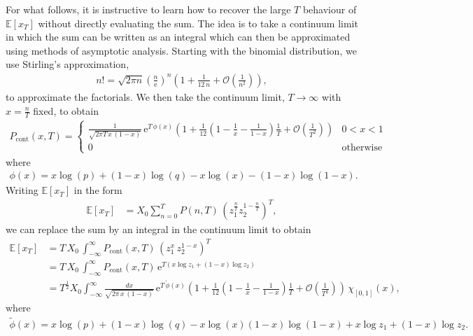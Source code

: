 \documentclass[11pt]{article}
\begin{document}
For what follows, it is instructive to learn how to recover the large $T$ behaviour of $\mathbb{E}\left[x_T \right]$ without directly evaluating the sum.
The idea is to take a continuum limit in which the sum can be written as an integral which can then be approximated using methods of asymptotic analysis.
Starting with the binomial distribution, we use Stirling's approximation,
\begin{align}
n! = \sqrt{2 \pi n} \left( \frac{n}{\mathrm{e}}\right)^n\left(1 + \frac{1}{12\,n} + \mathcal{O}\left(\frac{1}{n^2}\right)\right),
\end{align}
to approximate the factorials. We then take the continuum limit, $T\to \infty$ with $x=\frac{n}{T}$ fixed,
 to obtain 
\begin{align}
\label{eq-binomial-distribution-cts-limit}
P_\text{cont}(x, T) = \left\{
\begin{array}{ll}
\frac{1}{\sqrt{2 \pi T \,x\,(1-x)}}\,\mathrm{e}^{T\,\phi(x)}\left(1 + \frac{1}{12}\left( 1-\frac{1}{x} - \frac{1}{1-x}\right) \frac{1}{T}   + \mathcal{O}\left(\frac{1}{T^2}\right)\right) & 0 < x< 1\\
0 & \text{otherwise}
\end{array}
\right.
\end{align}
where
\begin{align}
\label{eq-phi}
\phi(x) =    x \log(p) +  (1 - x) \log (q)  - x \log(x) -  (1 - x) \log(1 - x).
\end{align}
Writing $\mathbb{E}\left[x_T \right]$ in the form
\begin{align*}
\mathbb{E}\left[x_T \right] &=   X_0 \sum_{n=0}^T  P(n,T) \, \left(z_1^\frac{n}{T} z_2^{1-\frac{n}{T}}\right)^T,
\end{align*}
we can replace the sum by an integral in the continuum limit to obtain
\begin{align}
\nonumber \mathbb{E}\left[x_T \right] &=   T\,X_0\, \int_{-\infty}^\infty P_\text{cont}(x, T)\,\left( z_1^x\,z_2^{1-x}\right)^T\\ 
\nonumber & = T\,X_0\, \int_{-\infty}^\infty P_\text{cont}(x, T)\,\mathrm{e}^{T\left(x\log z_1 + (1-x)\log z_2 \right)}\\
\label{eq-Ex-mult1} & = T^\frac{1}{2} X_0  \int_{-\infty}^\infty  \frac{d x}{\sqrt{2 \pi \,x\,(1-x)}}\,\mathrm{e}^{T\,\widetilde{\phi}(x)}\left(1 + \frac{1}{12}\left( 1-\frac{1}{x} - \frac{1}{1-x}\right) \frac{1}{T}   + \mathcal{O}\left(\frac{1}{T^2}\right)\right) \, \chi_{\left[0, 1\right]}(x),
\end{align}
where 
\begin{align}
\widetilde{\phi}(x) =  x \log(p) +  (1 - x) \log (q)  - x \log(x)  (1 - x) \log(1 - x) + x \log z_1 +  (1-x)\log z_2.
\end{align}
\end{document}
